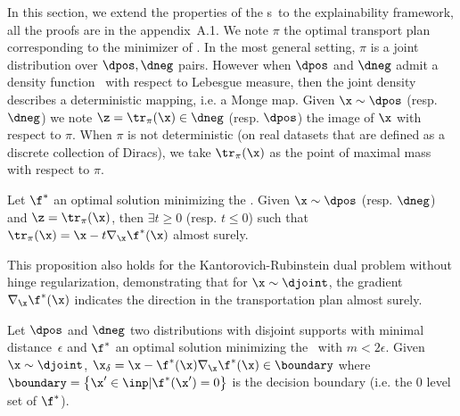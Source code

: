 In this section, we extend the properties of the \otnn s~to the explainability framework, all the proofs are in the appendix~A.1. We note $\pi$ the optimal transport plan corresponding to the minimizer of \losshkr. In the most general setting, $\pi$ is a joint distribution over $\dpos,\dneg$ pairs. However when $\dpos$ and $\dneg$ admit a density function~\cite{peyre2018computational} with respect to Lebesgue measure, then the joint density describes a deterministic mapping, i.e. a Monge map. Given $\x \sim \dpos$ %
(resp. $\dneg$) we note $\z = \tr_\pi(\x) \in \dneg$ (resp. $\dpos$) the image of $\x$ with respect to $\pi$. When $\pi$ is not deterministic (on real datasets that are defined as a discrete collection of Diracs), we take $\tr_\pi(\x)$ as the point of maximal mass with respect to $\pi$.%


\begin{proposition}\label{th:gradient_transport_plan}
Let $\f^*$ an optimal solution minimizing the \losshkr. Given $\x \sim \dpos$ (resp. $\dneg$)  and  $\z = \tr_\pi(\x)$, then $\exists t \geq 0$ (resp. $t \leq 0$) such that $\tr_\pi(\x) = \x  -t \nabla_{\x}  \f^*(\x)$ almost surely. 
\end{proposition}

This proposition also holds for the Kantorovich-Rubinstein dual problem without hinge regularization, demonstrating that for $\x \sim \djoint$,
 the gradient $\nabla_{\x} \f^{*}(\x)$ indicates the direction in the transportation plan almost surely.

\begin{proposition}\label{boundary_distance}
Let $\dpos$ and $\dneg$ two distributions with disjoint supports with minimal distance~$\epsilon$ and  $\f^*$ an optimal solution minimizing the \losshkr~with $m<2\epsilon$. Given $\x \sim \djoint$, %
$\x_\delta = \x -\f^*(\x) \nabla_{\x} \f^*(\x) \in \boundary $
where $\boundary = \left\{\x' \in \inp | \f^*(\x') = 0 \right\}$  is the decision boundary (i.e. the 0 level set of $\f^*$).
\end{proposition}


